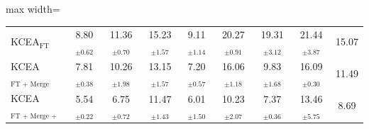\begin{adjustbox}{max width=\textwidth}
\begin{tabular}{l c c c c c c c c}
\midrule
KCEA$_{\text{FT}}$ & 8.80$_{\pm 0.62}$ & 11.36$_{\pm 0.70}$ & 15.23$_{\pm 1.57}$ & 9.11$_{\pm 1.14}$ & 20.27$_{\pm 0.91}$ & 19.31$_{\pm 3.12}$ & 21.44$_{\pm 3.87}$ & 15.07 \\
KCEA$_{\text{FT + Merge}}$ & 7.81$_{\pm 0.38}$ & 10.26$_{\pm 1.98}$ & 13.15$_{\pm 1.57}$ & 7.20$_{\pm 0.57}$ & 16.06$_{\pm 1.18}$ & 9.83$_{\pm 1.68}$ & 16.09$_{\pm 0.30}$ & 11.49 \\
KCEA$_{\text{FT + Merge + Align}}$ & 5.54$_{\pm 0.22}$ & 6.75$_{\pm 0.72}$ & 11.47$_{\pm 1.43}$ & 6.01$_{\pm 1.50}$ & 10.23$_{\pm 2.07}$ & 7.37$_{\pm 0.36}$ & 13.46$_{\pm 5.75}$ & 8.69 \\
\bottomrule
\end{tabular}
\end{adjustbox}